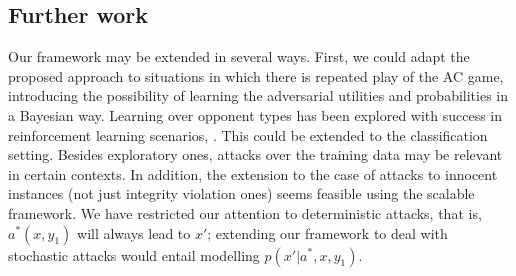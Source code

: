\subsection{Further work}

Our framework may be extended in several ways. First, we could adapt the proposed approach to situations in which there is repeated play of the AC game, introducing the possibility of learning the adversarial utilities and probabilities in a Bayesian way. Learning over opponent types has been explored with success in reinforcement learning scenarios, \cite{gallego2019opponent}. This could be extended to the classification setting. Besides exploratory ones, attacks over the training data \cite{biggio2012poisoning} may be relevant in certain contexts. 
In addition, the extension to the case of attacks to innocent instances (not just integrity violation ones) seems feasible using the scalable framework. %
We have restricted our attention to deterministic attacks, that is, $a^*(x,y_1)$ will always lead to $x'$; extending our framework to deal with stochastic attacks would entail modelling $p(x' \vert a^*, x, y_1)$. 




